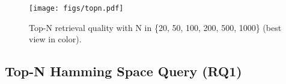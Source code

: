 \begin{figure*}[t]
\begin{minipage}{1\textwidth}
\vspace{-0.05in}
\texttt{[image: figs/topn.pdf]}
\end{minipage} 
\vspace{-0.1in}
\caption{Top-N retrieval quality with N in \{20, 50, 100, 200, 500, 1000\} (best view in color).}
\label{fig:topn}
\end{figure*}



\subsection{Top-N Hamming Space Query (RQ1)}
\label{sec:exp_topn}

